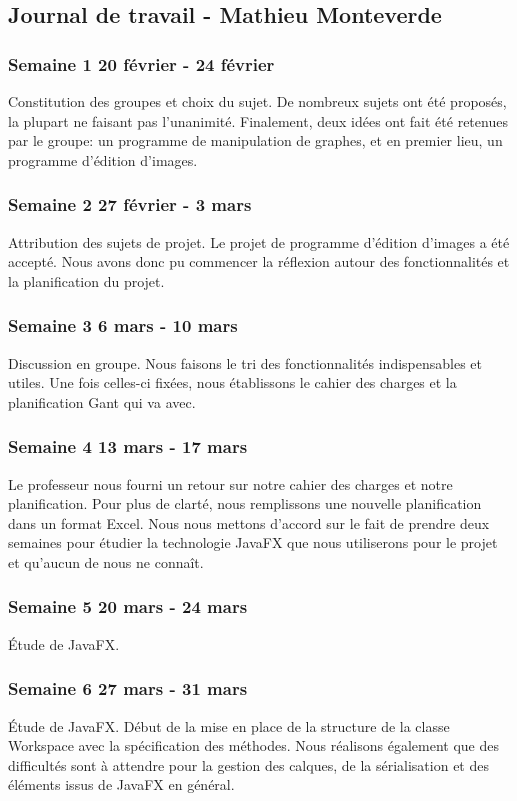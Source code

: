 \subsection{Journal de travail - Mathieu Monteverde}

\subsubsection{Semaine 1 20 février - 24 février}
Constitution des groupes et choix du sujet. De nombreux sujets ont été proposés, la plupart ne faisant pas l'unanimité. Finalement, deux idées ont fait été retenues par le groupe: un programme de manipulation de graphes, et en premier lieu, un programme d'édition d'images.
\subsubsection{Semaine 2 27 février - 3 mars}
Attribution des sujets de projet. Le projet de programme d'édition d'images a été accepté. Nous avons donc pu commencer la réflexion autour des fonctionnalités et la planification du projet.
\subsubsection{Semaine 3 6 mars - 10 mars}
Discussion en groupe. Nous faisons le tri des fonctionnalités indispensables et utiles. Une fois celles-ci fixées, nous établissons le cahier des charges et la planification Gant qui va avec.
\subsubsection{Semaine 4 13 mars - 17 mars}
Le professeur nous fourni un retour sur notre cahier des charges et notre planification. Pour plus de clarté, nous remplissons une nouvelle planification dans un format Excel. Nous nous mettons d'accord sur le fait de prendre deux semaines pour étudier la technologie JavaFX que nous utiliserons pour le projet et qu'aucun de nous ne connaît.
\subsubsection{Semaine 5 20 mars - 24 mars}
Étude de JavaFX.
\subsubsection{Semaine 6 27 mars - 31 mars}
Étude de JavaFX. Début de la mise en place de la structure de la classe Workspace avec la spécification des méthodes. Nous réalisons également que des difficultés sont à attendre pour la gestion des calques, de la sérialisation et des éléments issus de JavaFX en général.
